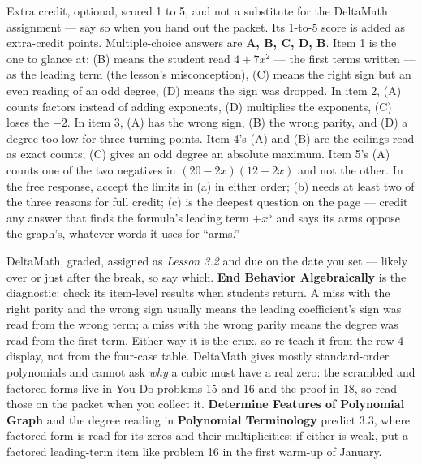 \documentclass[10pt]{article}
\begin{document}
\begin{teachernote}[AP Practice]
Extra credit, optional, scored 1 to 5, and not a substitute for the DeltaMath assignment ---
say so when you hand out the packet. Its 1-to-5 score is added as extra-credit points.
Multiple-choice answers are \textbf{A, B, C, D, B}. Item 1 is the one to glance at: (B) means
the student read $4 + 7x^2$ --- the first terms written --- as the leading term (the lesson's
misconception), (C) means the right sign but an even reading of an odd degree, (D) means the
sign was dropped. In item 2, (A) counts factors instead of adding exponents, (D) multiplies
the exponents, (C) loses the $-2$. In item 3, (A) has the wrong sign, (B) the wrong parity,
and (D) a degree too low for three turning points. Item 4's (A) and (B) are the ceilings read
as exact counts; (C) gives an odd degree an absolute maximum. Item 5's (A) counts one of the
two negatives in $(20 - 2x)(12 - 2x)$ and not the other. In the free response, accept the
limits in (a) in either order; (b) needs at least two of the three reasons for full credit;
(c) is the deepest question on the page --- credit any answer that finds the formula's leading
term $+x^5$ and says its arms oppose the graph's, whatever words it uses for ``arms.''
\end{teachernote}

\begin{teachernote}[Homework]
DeltaMath, graded, assigned as \textit{Lesson 3.2} and due on the date you set --- likely over
or just after the break, so say which. \textbf{End Behavior Algebraically} is the diagnostic:
check its item-level results when students return. A miss with the right parity and the wrong
sign usually means the leading coefficient's sign was read from the wrong term; a miss with the
wrong parity means the degree was read from the first term. Either way it is the crux, so
re-teach it from the row-4 display, not from the four-case table. DeltaMath gives
mostly standard-order polynomials and cannot ask \emph{why} a cubic must have a real zero:
the scrambled and factored forms live in You Do problems 15 and 16 and the proof in 18, so
read those on the packet when you collect it. \textbf{Determine Features of Polynomial Graph}
and the degree reading in \textbf{Polynomial Terminology} predict 3.3, where factored form is
read for its zeros and their multiplicities; if either is weak, put a factored leading-term
item like problem 16 in the first warm-up of January.
\end{teachernote}
\end{document}
